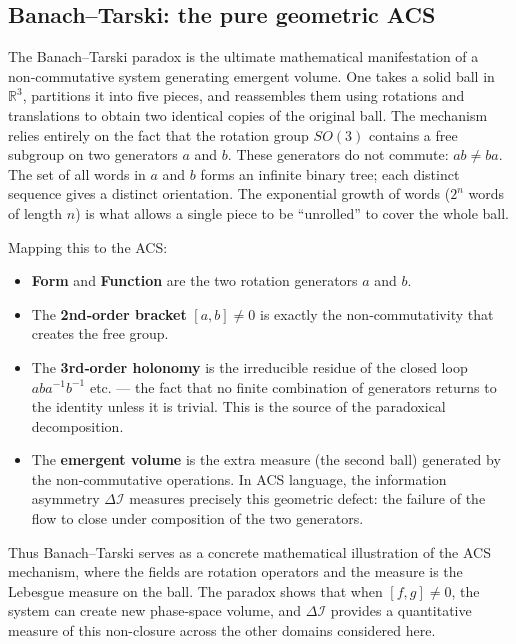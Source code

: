 \documentclass[12pt,a4paper]{article}
\theoremstyle{plain}
\theoremstyle{definition}
\theoremstyle{remark}
\newcommand{\DI}{\Delta\mathcal{I}}
\begin{document}
\subsection{Banach–Tarski: the pure geometric ACS}

The Banach–Tarski paradox is the ultimate mathematical manifestation of a non‑commutative
system generating emergent volume.  One takes a solid ball in $\mathbb{R}^3$, partitions it
into five pieces, and reassembles them using rotations and translations to obtain two
identical copies of the original ball.  The mechanism relies entirely on the fact that
the rotation group $SO(3)$ contains a free subgroup on two generators $a$ and $b$.
These generators do not commute: $ab \neq ba$.  The set of all words in $a$ and $b$ forms
an infinite binary tree; each distinct sequence gives a distinct orientation.
The exponential growth of words ($2^n$ words of length $n$) is what allows a single piece
to be “unrolled” to cover the whole ball.

Mapping this to the ACS:
\begin{itemize}[noitemsep]
  \item \textbf{Form} and \textbf{Function} are the two rotation generators $a$ and $b$.
  \item The \textbf{2nd‑order bracket} $[a,b] \neq 0$ is exactly the non‑commutativity that
    creates the free group.
  \item The \textbf{3rd‑order holonomy} is the irreducible residue of the closed loop
    $a b a^{-1} b^{-1}$ etc. — the fact that no finite combination of generators returns
    to the identity unless it is trivial.  This is the source of the paradoxical decomposition.
  \item The \textbf{emergent volume} is the extra measure (the second ball) generated by
    the non‑commutative operations.  In ACS language, the information asymmetry $\DI$
    measures precisely this geometric defect: the failure of the flow to close under
    composition of the two generators.
\end{itemize}

Thus Banach--Tarski serves as a concrete mathematical illustration of the ACS
mechanism, where the fields are rotation operators and the measure is the Lebesgue
measure on the ball.  The paradox shows that when $[f,g] \neq 0$, the system can
create new phase-space volume, and $\DI$ provides a quantitative measure of this
non-closure across the other domains considered here.

\end{document}
